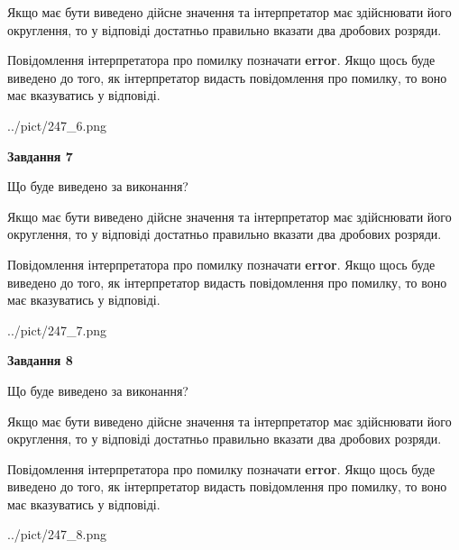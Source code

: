 \documentclass[12pt, ukrainian]{article}
\begin{document}
{\begin {Large}
Якщо має бути виведено дійсне значення та інтерпретатор має здійснювати його округлення, 
то у відповіді достатньо правильно вказати два дробових розряди.

Повідомлення інтерпретатора про помилку позначати \textbf{error}.
Якщо щось буде виведено до того, як інтерпретатор видасть повідомлення про помилку, 
то воно має вказуватись у відповіді. \par

\begin{center}
	{../pict/247_6.png}
\end{center}
\newpage

{\begin {center}\textbf{Завдання 7}\end {center}}\par
Що буде виведено за виконання? \par

Якщо має бути виведено дійсне значення та інтерпретатор має здійснювати його округлення, 
то у відповіді достатньо правильно вказати два дробових розряди.

Повідомлення інтерпретатора про помилку позначати \textbf{error}.
Якщо щось буде виведено до того, як інтерпретатор видасть повідомлення про помилку, 
то воно має вказуватись у відповіді. \par

\begin{center}
	{../pict/247_7.png}
\end{center}
\newpage

{\begin {center}\textbf{Завдання 8}\end {center}}\par
Що буде виведено за виконання? \par

Якщо має бути виведено дійсне значення та інтерпретатор має здійснювати його округлення, 
то у відповіді достатньо правильно вказати два дробових розряди.

Повідомлення інтерпретатора про помилку позначати \textbf{error}.
Якщо щось буде виведено до того, як інтерпретатор видасть повідомлення про помилку, 
то воно має вказуватись у відповіді. \par

\begin{center}
	{../pict/247_8.png}
\end{center}
\newpage


\end{Large}}
\end{document}
